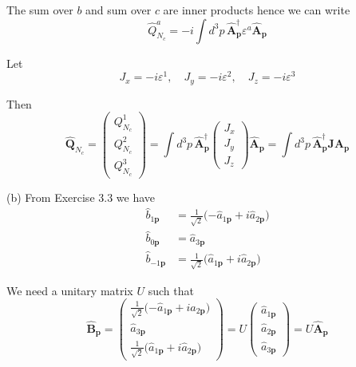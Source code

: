 The sum over $b$ and sum over $c$ are inner products hence we can write
\begin{equation*}
\hat Q_{N_c}^a=-i\int d^3p\,\hat{\mathbf A}_{\mathbf p}^\dag\varepsilon^a\hat{\mathbf A}_{\mathbf p}
\end{equation*}

Let
\begin{equation*}
J_x=-i\varepsilon^1,
\quad
J_y=-i\varepsilon^2,
\quad
J_z=-i\varepsilon^3
\end{equation*}

Then
\begin{equation*}
\hat{\mathbf Q}_{N_c}=\begin{pmatrix}Q_{N_c}^1\\Q_{N_c}^2\\Q_{N_c}^3\end{pmatrix}
=\int d^3p\,\hat{\mathbf A}_{\mathbf p}^\dag\begin{pmatrix}J_x\\J_y\\J_z\end{pmatrix}\hat{\mathbf A}_{\mathbf p}
=\int d^3p\,\hat{\mathbf A}_{\mathbf p}^\dag\mathbf J\hat{\mathbf A}_{\mathbf p}
\end{equation*}

(b) From Exercise 3.3 we have
\begin{align*}
\hat b_{1\mathbf p}&=\frac{1}{\sqrt2}\big({-\hat a_{1\mathbf p}}+i\hat a_{2\mathbf p}\big)
\\
\hat b_{0\mathbf p}&=\hat a_{3\mathbf p}
\\
\hat b_{-1\mathbf p}&=\frac{1}{\sqrt2}\big(\hat a_{1\mathbf p}+i\hat a_{2\mathbf p}\big)
\end{align*}

We need a unitary matrix $U$ such that
\begin{equation*}
\hat{\mathbf B}_{\mathbf p}=
\begin{pmatrix}
\frac{1}{\sqrt2}\big({-\hat a_{1\mathbf p}}+i\hat a_{2\mathbf p}\big)
\\
\hat a_{3\mathbf p}
\\
\frac{1}{\sqrt2}\big(\hat a_{1\mathbf p}+i\hat a_{2\mathbf p}\big)
\end{pmatrix}
=U\begin{pmatrix}
\hat a_{1\mathbf p}
\\
\hat a_{2\mathbf p}
\\
\hat a_{3\mathbf p}
\end{pmatrix}
=U\hat{\mathbf A}_{\mathbf p}
\end{equation*}

